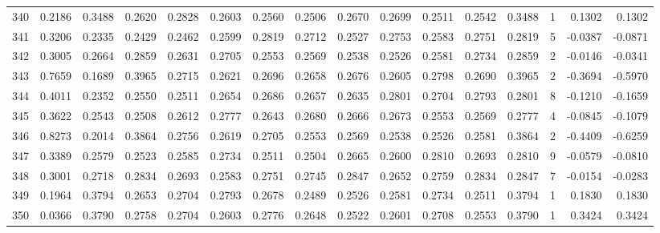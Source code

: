 \begin{tabular}{lrrrrrrrrrrrrrrr}
340 &      0.2186 &  0.3488 &  0.2620 &  0.2828 &  0.2603 &  0.2560 &  0.2506 &  0.2670 &  0.2699 &  0.2511 &   0.2542 &     0.3488 &      1 &                    0.1302 &                     0.1302 \\
341 &      0.3206 &  0.2335 &  0.2429 &  0.2462 &  0.2599 &  0.2819 &  0.2712 &  0.2527 &  0.2753 &  0.2583 &   0.2751 &     0.2819 &      5 &                   -0.0387 &                    -0.0871 \\
342 &      0.3005 &  0.2664 &  0.2859 &  0.2631 &  0.2705 &  0.2553 &  0.2569 &  0.2538 &  0.2526 &  0.2581 &   0.2734 &     0.2859 &      2 &                   -0.0146 &                    -0.0341 \\
343 &      0.7659 &  0.1689 &  0.3965 &  0.2715 &  0.2621 &  0.2696 &  0.2658 &  0.2676 &  0.2605 &  0.2798 &   0.2690 &     0.3965 &      2 &                   -0.3694 &                    -0.5970 \\
344 &      0.4011 &  0.2352 &  0.2550 &  0.2511 &  0.2654 &  0.2686 &  0.2657 &  0.2635 &  0.2801 &  0.2704 &   0.2793 &     0.2801 &      8 &                   -0.1210 &                    -0.1659 \\
345 &      0.3622 &  0.2543 &  0.2508 &  0.2612 &  0.2777 &  0.2643 &  0.2680 &  0.2666 &  0.2673 &  0.2553 &   0.2569 &     0.2777 &      4 &                   -0.0845 &                    -0.1079 \\
346 &      0.8273 &  0.2014 &  0.3864 &  0.2756 &  0.2619 &  0.2705 &  0.2553 &  0.2569 &  0.2538 &  0.2526 &   0.2581 &     0.3864 &      2 &                   -0.4409 &                    -0.6259 \\
347 &      0.3389 &  0.2579 &  0.2523 &  0.2585 &  0.2734 &  0.2511 &  0.2504 &  0.2665 &  0.2600 &  0.2810 &   0.2693 &     0.2810 &      9 &                   -0.0579 &                    -0.0810 \\
348 &      0.3001 &  0.2718 &  0.2834 &  0.2693 &  0.2583 &  0.2751 &  0.2745 &  0.2847 &  0.2652 &  0.2759 &   0.2834 &     0.2847 &      7 &                   -0.0154 &                    -0.0283 \\
349 &      0.1964 &  0.3794 &  0.2653 &  0.2704 &  0.2793 &  0.2678 &  0.2489 &  0.2526 &  0.2581 &  0.2734 &   0.2511 &     0.3794 &      1 &                    0.1830 &                     0.1830 \\
350 &      0.0366 &  0.3790 &  0.2758 &  0.2704 &  0.2603 &  0.2776 &  0.2648 &  0.2522 &  0.2601 &  0.2708 &   0.2553 &     0.3790 &      1 &                    0.3424 &                     0.3424 \\

\end{tabular}
